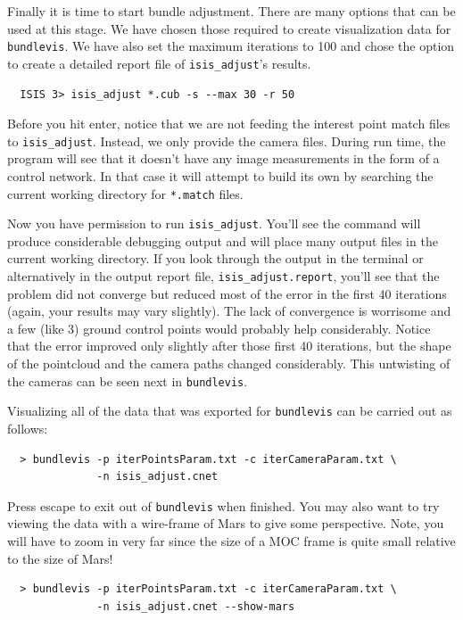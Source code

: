 Finally it is time to start bundle adjustment. There are many options
that can be used at this stage.  We have chosen those required to
create visualization data for \texttt{bundlevis}.  We have also set
the maximum iterations to 100 and chose the option to create a
detailed report file of \texttt{isis\_adjust}'s results.

\begin{verbatim}
  ISIS 3> isis_adjust *.cub -s --max 30 -r 50
\end{verbatim}

Before you hit enter, notice that we are not feeding the interest
point match files to \texttt{isis\_adjust}. Instead, we only provide
the camera files. During run time, the program will see that it
doesn't have any image measurements in the form of a control
network. In that case it will attempt to build its own by searching
the current working directory for \texttt{*.match} files.

Now you have permission to run \texttt{isis\_adjust}. You'll see the
command will produce considerable debugging output and will place many
output files in the current working directory. If you look through the
output in the terminal or alternatively in the output report file,
\texttt{isis\_adjust.report}, you'll see that the problem did not
converge but reduced most of the error in the first 40 iterations
(again, your results may vary slightly). The lack of convergence is
worrisome and a few (like 3) ground control points would probably help
considerably.  Notice that the error improved only slightly after
those first 40 iterations, but the shape of the pointcloud and the
camera paths changed considerably. This untwisting of the cameras can
be seen next in \texttt{bundlevis}.

Visualizing all of the data that was exported for \texttt{bundlevis}
can be carried out as follows:

\begin{verbatim}
  > bundlevis -p iterPointsParam.txt -c iterCameraParam.txt \
              -n isis_adjust.cnet
\end{verbatim}

Press escape to exit out of \texttt{bundlevis} when finished.  You may
also want to try viewing the data with a wire-frame of Mars to give
some perspective. Note, you will have to zoom in very far since the
size of a MOC frame is quite small relative to the size of Mars!

\begin{verbatim}
  > bundlevis -p iterPointsParam.txt -c iterCameraParam.txt \
              -n isis_adjust.cnet --show-mars
\end{verbatim}

